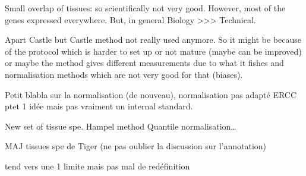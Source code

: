 Small overlap of tissues: so scientifically not very good.
However, most of the genes expressed everywhere.
But, in general Biology >>> Technical.

Apart Castle but Castle method not really used anymore. So it might be because of
the protocol which is harder to set up or not mature (maybe can be improved) or
maybe the method gives different measurements due to what it fishes and
normalisation methods which are not very good for that (biases).


Petit blabla sur la normalisation (de nouveau), normalisation pas adapté
ERCC ptet 1 idée mais pas vraiment un internal standard.




New set of tissue spe.
Hampel method
Quantile normalisation\ldots

MAJ tissues spe de Tiger (ne pas oublier la discussion sur l'annotation)

tend vers une 1 limite mais pas mal de redéfinition




\begin{comment}
  \begin{figure}%
      \includegraphics%
      {transcriptomics/}\centering
      \caption[]
      {\label{fig:}\textbf{}}
  \end{figure}
\end{comment}
